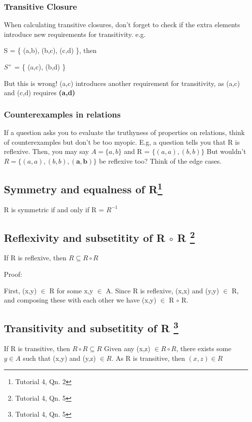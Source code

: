 \documentclass{article}
\begin{document}
\subsubsection{Transitive Closure}
When calculating transitive closures, don't forget to check if the extra elements introduce new requirements for transitivity.
e.g.

\vspace{10pt}

S = \{ (a,b), (b,c), (c,d) \}, then

\vspace{10pt}
$S^+$ = \{ (a,c), (b,d) \}

\vspace{10pt}

But this is wrong! (a,c) introduces another requirement for transitivity, as (a,c) and (c,d) requires \textbf{(a,d)}

\subsubsection{Counterexamples in relations}
If a question asks you to evaluate the truthyness of properties on relations, think of counterexamples but don't be too myopic. E.g, a question tells you that R is reflexive. Then, you may say $A = \{a, b\}$ and R = $\{(a,a), (b,b)\}$ But wouldn't $R = \{(a,a), (b,b), \mathbf{(a,b)}\}$ be reflexive too? Think of the edge cases.

\subsection[Symmetry and equalness of R]{Symmetry and equalness of R\footnote{Tutorial 4, Qn. 2}}
R is symmetric if and only if R = $R^{-1}$

\subsection[Reflexivity and subsetitity of R $\circ$ R]{Reflexivity and subsetitity of R $\circ$ R \footnote{Tutorial 4, Qn. 5}}
If R is reflexive, then $R \subseteq R \circ R$

Proof:

First, (x,y) $\in$ R for some x,y $\in$ A. Since R is reflexive, (x,x) and (y,y) $\in$ R, and composing these with each other we have (x,y) $\in$ R $\circ$ R.

\subsection[Transitivity and subsetitity of R]{Transitivity and subsetitity of R \footnote{Tutorial 4, Qn. 5}}
If R is transitive, then $R \circ R \subseteq R$
Given any (x,z) $\in R \circ R$, there exists some $y \in A$ such that (x,y) and (y,z) $\in R$. As R is transitive, then $(x,z)\in R$
\end{document}
